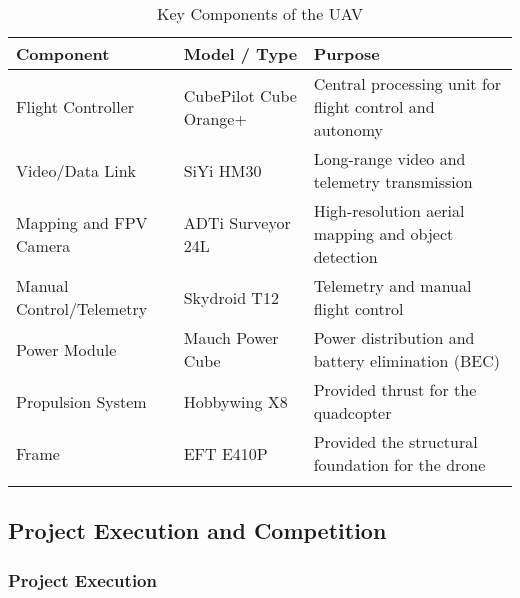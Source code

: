 \vspace*{1cm}
\begin{longtable}[h!]{|l|l|p{5cm}|} \hline
	\textbf{Component}       & \textbf{Model / Type}       & \textbf{Purpose}                                        \\ \hline
	Flight Controller        & CubePilot Cube Orange+      & Central processing unit for flight control and autonomy \\ \hline
	Video/Data Link          & SiYi HM30                   & Long-range video and telemetry transmission             \\ \hline
	Mapping and FPV Camera   & ADTi Surveyor 24L           & High-resolution aerial mapping and object detection     \\ \hline
	Manual Control/Telemetry & Skydroid T12                & Telemetry and manual flight control           \\ \hline
	Power Module             & Mauch Power Cube            & Power distribution and battery elimination (BEC)        \\ \hline
	Propulsion System        & Hobbywing X8                & Provided thrust for the quadcopter                      \\ \hline
	Frame                    & EFT E410P  & Provided the structural foundation for the drone        \\ \hline
	\caption{Key Components of the UAV}
\end{longtable}


\subsection{Project Execution and Competition}

\subsubsection{Project Execution}

